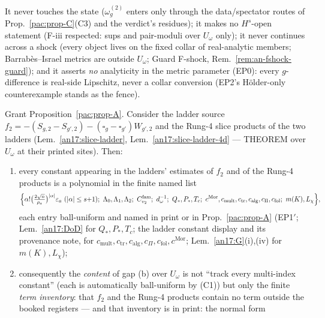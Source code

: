 \begin{remark}\label{pac:rem-A-scope}
It never touches the state ($\omega^{(2)}_g$ enters only through the
data/spectator routes of Prop.~\ref{pac:prop-C}(C3) and the verdict's
residues); it makes no $H^s$-open statement (F-iii respected: sups and
pair-moduli over $U_\omega$ only); it never continues across a shock
(every object lives on the fixed collar of real-analytic members;
Barrab\`es--Israel metrics are outside $U_\omega$; Guard F-shock, Rem.~\ref{rem:an-fshock-guard}); and it asserts \emph{no} analyticity
in the metric parameter (EP0): every $g$-difference is real-side
Lipschitz, never a collar conversion (EP2's H\"older-only
counterexample stands as the fence).
\end{remark}

\begin{proposition}\label{pac:prop-C}
Grant Proposition~\ref{pac:prop-A}. Consider the ladder source
$f_2=-(S_{g,2}-S_{g',2})-(\square_g-\square_{g'})W_{g',2}$ and the
Rung-4 slice products of the two ladders (Lem.~\ref{an17:slice-ladder},
Lem.~\ref{an17:slice-ladder-4d} --- THEOREM over $U_\omega$ at their printed
sites). Then:
\begin{enumerate}[label=\textup{(C\arabic*)},leftmargin=*,nosep]
\item every constant appearing in the ladders' estimates of $f_2$ and
  of the Rung-4 products is a polynomial in the finite named list
  \[
    \Bigl\{\alpha!\bigl(\tfrac{2\sqrt n}{\rho_a}\bigr)^{|\alpha|}
    \varepsilon_a\ (|\alpha|\le s{+}1);\ \Lambda_0,\Lambda_1,\Lambda_2;
    \ C^{\mathrm{fam}}_{v_2};\ d_\omega^{-1};\ Q_*,P_*,T_c;\
    c^{\mathrm{Mor}},c_{\mathrm{mult}},c_{\mathrm{tr}},
    c_{\mathrm{alg}},c_\Pi,c_{\mathrm{fol}};\ m(K),L_\chi\Bigr\},
  \]
  each entry ball-uniform and named in print or in
  Prop.~\ref{pac:prop-A} (EP1$'$; Lem.~\ref{an17:DoD} for
  $Q_*,P_*,T_c$; the ladder constant display and its provenance note,
  for
  $c_{\mathrm{mult}},c_{\mathrm{tr}},c_{\mathrm{alg}},c_\Pi,
  c_{\mathrm{fol}},c^{\mathrm{Mor}}$; Lem.~\ref{an17:G}(i),(iv) for
  $m(K),L_\chi$);
\item consequently the \emph{content} of gap (b) over $U_\omega$ is
  not ``track every multi-index constant'' (each is automatically
  ball-uniform by (C1)) but only the finite \emph{term inventory}:
  that $f_2$ and the Rung-4 products contain no term outside the
  booked registers --- and that inventory is in print: the normal form

\end{enumerate}
\end{proposition}
